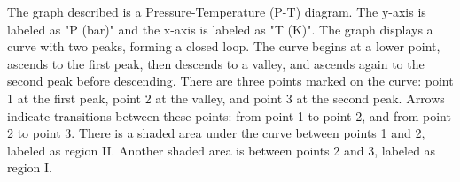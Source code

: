 The graph described is a Pressure-Temperature (P-T) diagram. The y-axis is labeled as "P (bar)" and the x-axis is labeled as "T (K)". The graph displays a curve with two peaks, forming a closed loop. The curve begins at a lower point, ascends to the first peak, then descends to a valley, and ascends again to the second peak before descending. There are three points marked on the curve: point 1 at the first peak, point 2 at the valley, and point 3 at the second peak. Arrows indicate transitions between these points: from point 1 to point 2, and from point 2 to point 3. There is a shaded area under the curve between points 1 and 2, labeled as region II. Another shaded area is between points 2 and 3, labeled as region I.